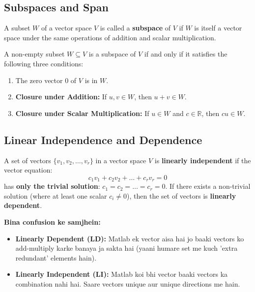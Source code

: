 \documentclass[11pt,a4paper]{article}
\begin{document}
\subsection{Subspaces and Span}

\begin{definitionbox}[Subspace]
A subset $W$ of a vector space $V$ is called a \textbf{subspace} of $V$ if $W$ is itself a vector space under the same operations of addition and scalar multiplication.
\end{definitionbox}

\begin{theorembox}
A non-empty subset $W \subseteq V$ is a subspace of $V$ if and only if it satisfies the following three conditions:
\begin{enumerate}
    \item The zero vector $0$ of $V$ is in $W$.
    \item \textbf{Closure under Addition:} If $u, v \in W$, then $u + v \in W$.
    \item \textbf{Closure under Scalar Multiplication:} If $u \in W$ and $c \in \mathbb{R}$, then $cu \in W$.
\end{enumerate}
\end{theorembox}

\subsection{Linear Independence and Dependence}

\begin{definitionbox}
A set of vectors $\{v_1, v_2, \dots, v_r\}$ in a vector space $V$ is \textbf{linearly independent} if the vector equation:
\[ c_1 v_1 + c_2 v_2 + \dots + c_r v_r = 0 \]
has \textbf{only the trivial solution}: $c_1 = c_2 = \dots = c_r = 0$.
If there exists a non-trivial solution (where at least one scalar $c_i \neq 0$), then the set of vectors is \textbf{linearly dependent}.
\end{definitionbox}

\begin{hinglishbox}
\textbf{Bina confusion ke samjhein:}
\begin{itemize}
    \item \textbf{Linearly Dependent (LD):} Matlab ek vector aisa hai jo baaki vectors ko add-multiply karke banaya ja sakta hai (yaani humare set me kuch 'extra redundant' elements hain).
    \item \textbf{Linearly Independent (LI):} Matlab koi bhi vector baaki vectors ka combination nahi hai. Saare vectors unique aur unique directions me hain.
\end{itemize}
\end{hinglishbox}
\end{document}
